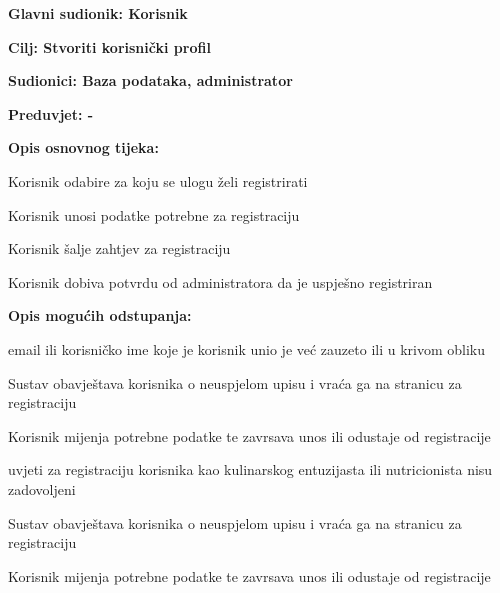 					\noindent {}
					\begin{packed_item}
	
						\item \textbf{Glavni sudionik: Korisnik}
						\item  \textbf{Cilj: Stvoriti korisnički profil}
						\item  \textbf{Sudionici: Baza podataka, administrator}
						\item  \textbf{Preduvjet: - } 
						\item  \textbf{Opis osnovnog tijeka:}
						
						\item[] \begin{packed_enum}
	
							\item Korisnik odabire za koju se ulogu želi registrirati
							\item Korisnik unosi podatke potrebne za registraciju
							\item Korisnik šalje zahtjev za registraciju
							\item Korisnik dobiva potvrdu od administratora da je uspješno registriran
						\end{packed_enum}
						
						\item  \textbf{Opis mogućih odstupanja:}
						
						\item[] \begin{packed_item}
	
							\item[2.a] email ili korisničko ime koje je korisnik unio je već zauzeto ili u krivom obliku
							\item[] \begin{packed_enum}
								
								\item Sustav obavještava korisnika o neuspjelom upisu i vraća ga na stranicu za registraciju
								\item Korisnik mijenja potrebne podatke te zavrsava unos ili odustaje od
registracije		
							\end{packed_enum}
							
							\item[3.a] uvjeti za registraciju korisnika kao kulinarskog entuzijasta ili nutricionista nisu zadovoljeni
							\item[] \begin{packed_enum}
								
								\item Sustav obavještava korisnika o neuspjelom upisu i vraća ga na stranicu za registraciju
								\item Korisnik mijenja potrebne podatke te zavrsava unos ili odustaje od
registracije		
							\end{packed_enum}
							
						\end{packed_item}
					\end{packed_item}
					
